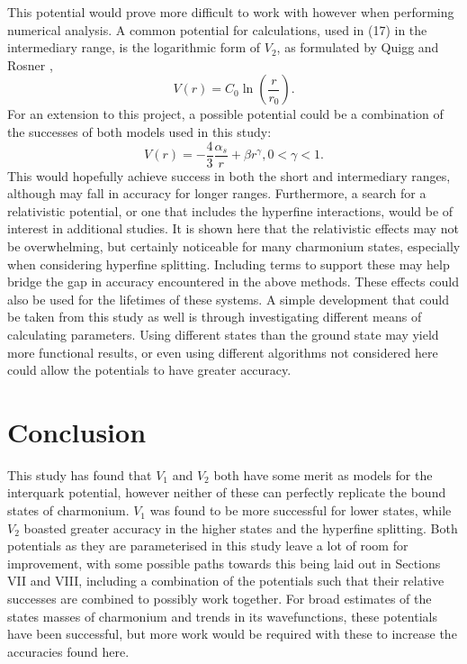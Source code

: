 \documentclass[10pt, twocolumn]{article}
\begin{document}
This potential would prove more difficult to work with however when performing numerical analysis.
A common potential for calculations, used in (17) in the intermediary range, is the logarithmic form of $V_2$, as formulated by Quigg and Rosner \cite{5},
\begin{equation}
    V(r) = C_0\ln\left(\frac{r}{r_0}\right).
\end{equation}
For an extension to this project, a possible potential could be a combination of the successes of both models used in this study:
\begin{equation}
    V(r) = -\frac43 \frac{\alpha_s}{r} + \beta r^\gamma, 0 < \gamma < 1.
\end{equation}
This would hopefully achieve success in both the short and intermediary ranges, although may fall in accuracy for longer ranges.
Furthermore, a search for a relativistic potential, or one that includes the hyperfine interactions, would be of interest in additional studies. 
It is shown here that the relativistic effects may not be overwhelming, but certainly noticeable for many charmonium states, especially when considering hyperfine splitting. 
Including terms to support these may help bridge the gap in accuracy encountered in the above methods.
These effects could also be used for the lifetimes of these systems. 
A simple development that could be taken from this study as well is through investigating different means of calculating parameters. 
Using different states than the ground state may yield more functional results, or even using different algorithms not considered here could allow the potentials to have greater accuracy.

\section{Conclusion}
This study has found that $V_1$ and $V_2$ both have some merit as models for the interquark potential, however neither of these can perfectly replicate the bound states of charmonium. 
$V_1$ was found to be more successful for lower states, while $V_2$ boasted greater accuracy in the higher states and the hyperfine splitting. 
Both potentials as they are parameterised in this study leave a lot of room for improvement, with some possible paths towards this being laid out in Sections \RN{7} and \RN{8}, including a combination of the potentials such that their relative successes are combined to possibly work together. 
For broad estimates of the states masses of charmonium and trends in its wavefunctions, these potentials have been successful, but more work would be required with these to increase the accuracies found here.
\end{document}
